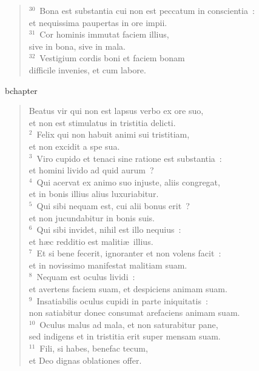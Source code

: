 \begin{verse}${}^{30}$~Bona est substantia cui non est peccatum in conscientia~:\\ et nequissima paupertas in ore impii.\\
${}^{31}$~Cor hominis immutat faciem illius,\\ sive in bona, sive in mala.\\
${}^{32}$~Vestigium cordis boni et faciem bonam\\ difficile invenies, et cum labore.\end{verse}


bchapter\begin{verse}\vspace{-19pt}Beatus vir qui non est lapsus verbo ex ore suo,\\ et non est stimulatus in tristitia delicti.\\
${}^{2}$~Felix qui non habuit animi sui tristitiam,\\ et non excidit a spe sua.\\
${}^{3}$~Viro cupido et tenaci sine ratione est substantia~:\\ et homini livido ad quid aurum~?\\
${}^{4}$~Qui acervat ex animo suo injuste, aliis congregat,\\ et in bonis illius alius luxuriabitur.\\
${}^{5}$~Qui sibi nequam est, cui alii bonus erit~?\\ et non jucundabitur in bonis suis.\\
${}^{6}$~Qui sibi invidet, nihil est illo nequius~:\\ et h\ae c redditio est maliti\ae\ illius.\\
${}^{7}$~Et si bene fecerit, ignoranter et non volens facit~:\\ et in novissimo manifestat malitiam suam.\\
${}^{8}$~Nequam est oculus lividi~:\\ et avertens faciem suam, et despiciens animam suam.\\
${}^{9}$~Insatiabilis oculus cupidi in parte iniquitatis~:\\ non satiabitur donec consumat arefaciens animam suam.\\
${}^{10}$~Oculus malus ad mala, et non saturabitur pane,\\ sed indigens et in tristitia erit super mensam suam.\\
${}^{11}$~Fili, si habes, benefac tecum,\\ et Deo dignas oblationes offer.\\

\end{verse}

